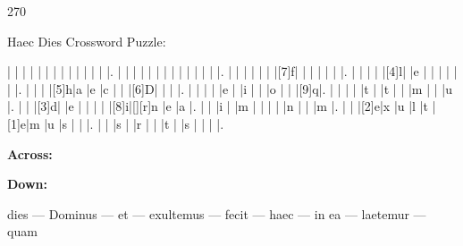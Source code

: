 \documentclass[12pt]{article}
\begin{document}
\pagestyle{fancy}
\fancyhf{}
\renewcommand{\headrulewidth}{0pt}
\renewcommand{\footrulewidth}{0pt}
\libertine
\renewcommand\PuzzleClueFont{\rm\normalsize}
\noindent\begin{rotate}{0}
\small
\end{rotate}
\hfill
\begin{rotate}{270}
\small
\end{rotate}
\begin{center}
  \huge{Haec Dies Crossword Puzzle:}
\end{center}
\vspace{1.5cm}
\begin{Puzzle}{15}{15}
  |{}  |{}  |{}  |{}  |{}  |{}  |{}  |{}  |{}  |{}  |{}  |{}  |{}  |.
  |{}  |{}  |{}  |{}  |{}  |{}  |{}  |{}  |{}  |{}  |{}  |{}  |{}  |.
  |{}  |{}  |{}  |{}  |{}  |{}  |[7]f|{}  |{}  |{}  |{}  |{}  |{}  |.
  |{}  |{}  |{}  |{}  |[4]l|{}  |e   |{}  |{}  |{}  |{}  |{}  |{}  |.
  |{}  |{}  |{}  |[5]h|a   |e   |c   |{}  |{}  |[6]D|{}  |{}  |{}  |.
  |{}  |{}  |{}  |{}  |e   |{}  |i   |{}  |{}  |o   |{}  |{}  |[9]q|.
  |{}  |{}  |{}  |{}  |t   |{}  |t   |{}  |{}  |m   |{}  |{}  |u   |.
  |{}  |{}  |[3]d|{}  |e   |{}  |{}  |{}  |{}  |[8]i|[][r]n   |e   |a   |.
  |{}  |{}  |i   |{}  |m   |{}  |{}  |{}  |{}  |n   |{}  |{}  |m   |.
  |{}  |{}  |[2]e|x   |u   |l   |t   |[1]e|m   |u   |s   |{}  |{}  |.
  |{}  |{}  |s   |{}  |r   |{}  |{}  |t   |{}  |s   |{}  |{}  |{}  |.
\end{Puzzle}
\begin{rotate}{90}
\small 
\end{rotate}
\hspace{-10pt}
\begin{PuzzleClues}{\textbf{Across:}}
\end{PuzzleClues}
\begin{PuzzleClues}{\textbf{Down:}}
\end{PuzzleClues}

\qquad

\begin{center}
\small 
dies --- Dominus --- et --- exultemus --- fecit --- haec --- in ea --- laetemur --- quam
\end{center}
\end{document}
